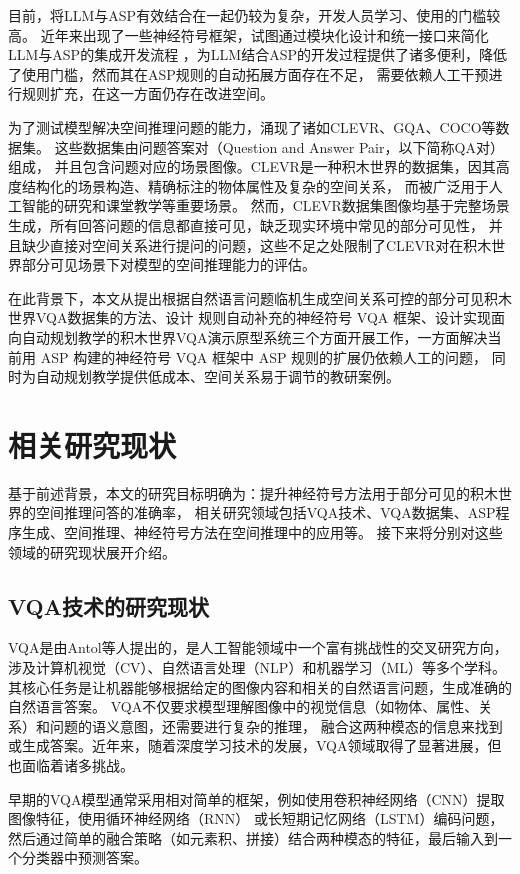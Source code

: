 目前，将LLM与ASP有效结合在一起仍较为复杂，开发人员学习、使用的门槛较高。
近年来出现了一些神经符号框架，试图通过模块化设计和统一接口来简化LLM与ASP的集成开发流程\cite{wang2024dspy}
，为LLM结合ASP的开发过程提供了诸多便利，降低了使用门槛，然而其在ASP规则的自动拓展方面存在不足，
需要依赖人工干预进行规则扩充，在这一方面仍存在改进空间。

为了测试模型解决空间推理问题的能力，涌现了诸如CLEVR、GQA、COCO等数据集。
这些数据集由问题答案对（Question and Answer Pair，以下简称QA对）组成，
并且包含问题对应的场景图像。CLEVR是一种积木世界的数据集，因其高度结构化的场景构造、精确标注的物体属性及复杂的空间关系，
而被广泛用于人工智能的研究和课堂教学等重要场景。
然而，CLEVR数据集图像均基于完整场景生成，所有回答问题的信息都直接可见，缺乏现实环境中常见的部分可见性，
并且缺少直接对空间关系进行提问的问题，这些不足之处限制了CLEVR对在积木世界部分可见场景下对模型的空间推理能力的评估\cite{sam-abraham-etal-2024-clevr}。

在此背景下，本文从提出根据自然语言问题临机生成空间关系可控的部分可见积木世界VQA数据集的方法、设计
规则自动补充的神经符号 VQA 框架、设计实现面向自动规划教学的积木世界VQA演示原型系统三个方面开展工作，一方面解决当前用 ASP 构建的神经符号 VQA 框架中 ASP 规则的扩展仍依赖人工的问题，
同时为自动规划教学提供低成本、空间关系易于调节的教研案例。
\section{相关研究现状}
基于前述背景，本文的研究目标明确为：提升神经符号方法用于部分可见的积木世界的空间推理问答的准确率，
相关研究领域包括VQA技术、VQA数据集、ASP程序生成、空间推理、神经符号方法在空间推理中的应用等。
接下来将分别对这些领域的研究现状展开介绍。
\subsection{VQA技术的研究现状}
VQA是由Antol等人\cite{Antol2015VQA}提出的，是人工智能领域中一个富有挑战性的交叉研究方向，
涉及计算机视觉（CV）、自然语言处理（NLP）和机器学习（ML）等多个学科。
其核心任务是让机器能够根据给定的图像内容和相关的自然语言问题，生成准确的自然语言答案。
VQA不仅要求模型理解图像中的视觉信息（如物体、属性、关系）和问题的语义意图，还需要进行复杂的推理，
融合这两种模态的信息来找到或生成答案。近年来，随着深度学习技术的发展，VQA领域取得了显著进展，但也面临着诸多挑战。

早期的VQA模型通常采用相对简单的框架，例如使用卷积神经网络（CNN）提取图像特征，使用循环神经网络（RNN）
或长短期记忆网络（LSTM）编码问题，然后通过简单的融合策略（如元素积、拼接）结合两种模态的特征，最后输入到一个分类器中预测答案。

